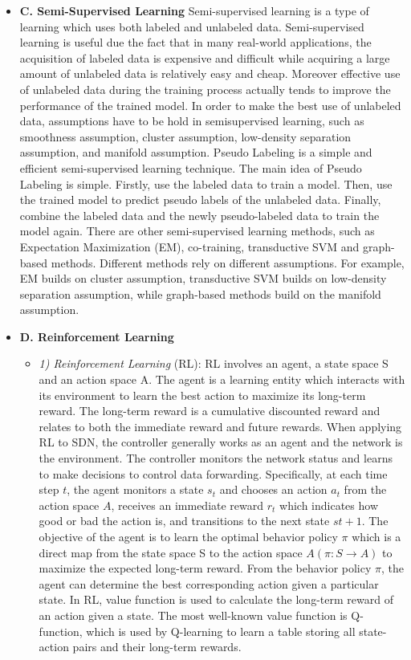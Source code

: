 \begin{itemize}
\begin{itemize}
\begin{itemize}
\end{itemize}
\end{itemize}
\item[] \textbf{C. Semi-Supervised Learning}
Semi-supervised learning is a type of learning which uses both labeled and unlabeled data. Semi-supervised learning is useful due the fact that in many real-world applications, the acquisition of labeled data is expensive and difficult while acquiring a large amount of unlabeled data is relatively easy and cheap. Moreover effective use of unlabeled data during the training process actually tends to improve the performance of the trained model. In order to make the best use of unlabeled data, assumptions have to be hold in semisupervised learning, such as smoothness assumption, cluster assumption, low-density separation assumption, and manifold assumption. Pseudo Labeling \cite{Wu2018} is a simple and efficient semi-supervised learning technique. The main idea of Pseudo Labeling is simple. Firstly, use the labeled data to train a model. Then, use the trained model to predict pseudo labels of the unlabeled data. Finally, combine the labeled data and the newly pseudo-labeled data to train the model again. There are other semi-supervised learning methods, such as Expectation Maximization (EM), co-training, transductive SVM and graph-based methods. Different methods rely on different assumptions. For example, EM builds on cluster assumption, transductive SVM builds on low-density separation assumption, while graph-based methods build on the manifold assumption.
\item[]\textbf{D. Reinforcement Learning}
\begin{itemize}
\item[]\textit{1)	Reinforcement Learning} (RL): RL \cite{Sutton2018, Kaelbling1996} involves an agent, a state space S and an action space A. The agent is a learning entity which interacts with its environment to learn the best action to maximize its long-term reward. The long-term reward is a cumulative discounted reward and relates to both the immediate reward and future rewards. When applying RL to SDN, the controller generally works as an agent and the network is the environment. The controller monitors the network status and learns to make decisions to control data forwarding. Specifically, at each time step $t$, the agent monitors a state $s_{t}$ and chooses an action $a_{t}$ from the action space $A$, receives an immediate reward $r_{t}$ which indicates how good or bad the action is, and transitions to the next state $st+1$. The objective of the agent is to learn the optimal behavior policy $\pi$ which is a direct map from the state space S to the action space $A (\pi : S \longrightarrow A)$ to maximize the expected long-term reward. From the behavior policy $\pi$, the agent can determine the best corresponding action given a particular state. In RL, value function is used to calculate the long-term reward of an action given a state. The most well-known value function is Q-function, which is used by Q-learning to learn a table storing all state-action pairs and their long-term rewards.

\end{itemize}
\end{itemize}

